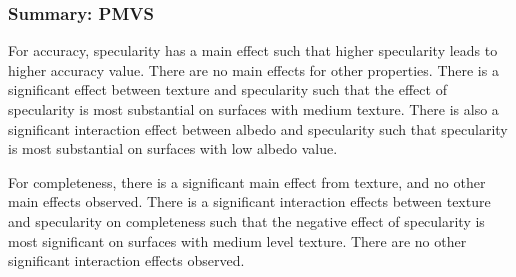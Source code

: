 \subsubsection{Summary: PMVS}
For accuracy, specularity has a main effect such that higher specularity leads to higher accuracy value. There are no main effects for other properties. There is a significant effect between texture and specularity such that the effect of specularity is most substantial on surfaces with medium texture. There is also a significant interaction effect between albedo and specularity such that specularity is most substantial on surfaces with low albedo value.

For completeness, there is a significant main effect from texture, and no other main effects observed. There is a significant interaction effects between texture and specularity on completeness such that the negative effect of specularity is most significant on surfaces with medium level texture. There are no other significant interaction effects observed.


